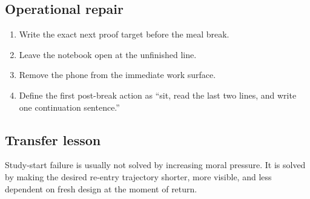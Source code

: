 \subsection*{Operational repair}
\begin{enumerate}[nosep]
  \item Write the exact next proof target before the meal break.
  \item Leave the notebook open at the unfinished line.
  \item Remove the phone from the immediate work surface.
  \item Define the first post-break action as ``sit, read the last two lines,
        and write one continuation sentence.''
\end{enumerate}

\subsection*{Transfer lesson}
Study-start failure is usually not solved by increasing moral pressure. It is
solved by making the desired re-entry trajectory shorter, more visible, and
less dependent on fresh design at the moment of return.
